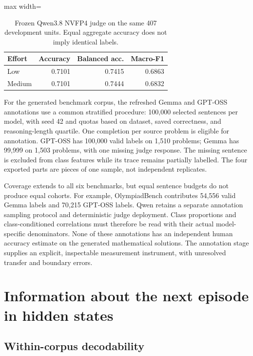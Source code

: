 \documentclass[12pt,a4paper,twoside,openright]{book}
\begin{document}
\begin{table}[!ht]
\centering\small
\caption{Frozen Qwen3.8 NVFP4 judge on the same 407 development units. Equal aggregate accuracy does not imply identical labels.}
\label{tab:res-effort}
\begin{adjustbox}{max width=\linewidth}%
\begin{tabular}{lrrr}
\toprule
Effort & Accuracy & Balanced acc. & Macro-F1 \\
\midrule
Low & 0.7101 & 0.7415 & 0.6863 \\
Medium & 0.7101 & 0.7444 & 0.6832 \\
\bottomrule
\end{tabular}
\end{adjustbox}
\end{table}


For the generated benchmark corpus, the refreshed Gemma and GPT-OSS
annotations use a common stratified procedure: 100,000 selected sentences
per model, with seed 42 and quotas based on dataset, saved correctness, and
reasoning-length quartile. One completion per source problem is eligible
for annotation. GPT-OSS has 100,000 valid labels on 1,510 problems; Gemma
has 99,999 on 1,503 problems, with one missing judge response. The missing
sentence is excluded from class features while its trace remains partially
labelled. The four exported parts are pieces of one sample, not independent
replicates.

Coverage extends to all six benchmarks, but equal sentence budgets do not
produce equal cohorts. For example, OlympiadBench contributes 54,556 valid
Gemma labels and 70,215 GPT-OSS labels. Qwen retains a separate annotation
sampling protocol and deterministic judge deployment. Class proportions and
class-conditioned correlations must therefore be read with their actual
model-specific denominators. None of these annotations has an independent
human accuracy estimate on the generated mathematical solutions. The
annotation stage supplies an explicit, inspectable measurement instrument,
with unresolved transfer and boundary errors.

\section{Information about the next episode in hidden states}
\label{sec:results-probes}

\subsection{Within-corpus decodability}
\end{document}
